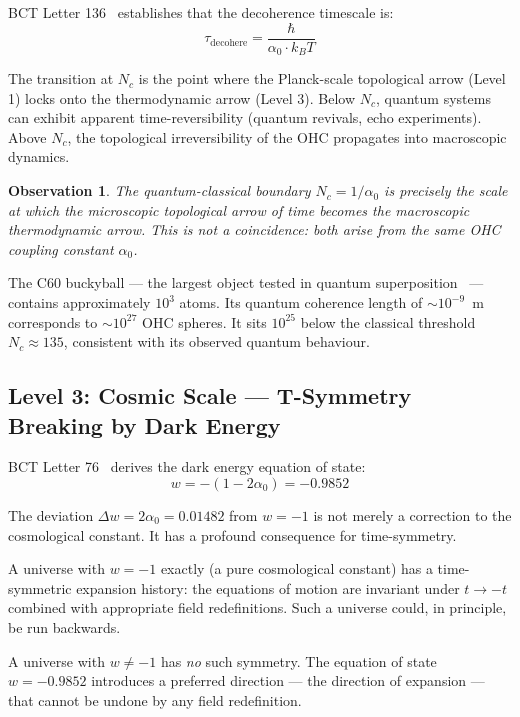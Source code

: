 \documentclass[aps,prl,twocolumn,superscriptaddress,floatfix]{revtex4-2}
\newtheorem{observation}{Observation}
\newcommand{\azero}{\alpha_0}
\newcommand{\Nc}{N_c}
\begin{document}
BCT Letter 136~\cite{BCT_L136} establishes that the 
decoherence timescale is:
\begin{equation}
\tau_{\mathrm{decohere}} = \frac{\hbar}{\azero \cdot k_B T}
\end{equation}

The transition at $\Nc$ is the point where the Planck-scale 
topological arrow (Level 1) locks onto the thermodynamic 
arrow (Level 3). Below $\Nc$, quantum systems can exhibit 
apparent time-reversibility (quantum revivals, echo experiments). 
Above $\Nc$, the topological irreversibility of the OHC 
propagates into macroscopic dynamics.

\begin{observation}
The quantum-classical boundary $\Nc = 1/\azero$ is precisely 
the scale at which the microscopic topological arrow of 
time becomes the macroscopic thermodynamic arrow. This is 
not a coincidence: both arise from the same OHC coupling 
constant $\azero$.
\end{observation}

The C60 buckyball --- the largest object tested in 
quantum superposition~\cite{Arndt1999} --- contains 
approximately $10^3$ atoms. Its quantum coherence length 
of $\sim 10^{-9}$~m corresponds to $\sim 10^{27}$ OHC 
spheres. It sits $10^{25}$ below the classical threshold 
$\Nc \approx 135$, consistent with its observed quantum 
behaviour.

\subsection{Level 3: Cosmic Scale --- T-Symmetry Breaking by Dark Energy}

BCT Letter 76~\cite{BCT_L76} derives the dark energy 
equation of state:
\begin{equation}
w = -(1 - 2\azero) = -0.9852
\end{equation}

The deviation $\Delta w = 2\azero = 0.01482$ from 
$w = -1$ is not merely a correction to the cosmological 
constant. It has a profound consequence for time-symmetry.

A universe with $w = -1$ exactly (a pure cosmological 
constant) has a time-symmetric expansion history: 
the equations of motion are invariant under $t \to -t$ 
combined with appropriate field redefinitions. Such a 
universe could, in principle, be run backwards.

A universe with $w \neq -1$ has \emph{no} such symmetry. 
The equation of state $w = -0.9852$ introduces a preferred 
direction --- the direction of expansion --- that cannot 
be undone by any field redefinition.
\end{document}
